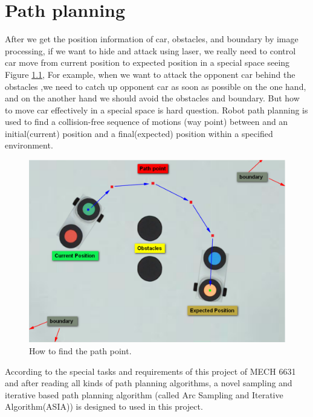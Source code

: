 \chapter{Path planning}
\label{cha:PathPlaning}

After we get the position information of car, obstacles, and boundary by image processing, if we want to hide and attack using laser, we really need to control car move from current position to expected position in a special space seeing Figure \ref{pathpoint},
For example, when we want to attack the opponent car behind the obstacles ,we need to catch up opponent car as soon as possible on the one hand, and on the another hand we should avoid the obstacles and boundary. But how to move car effectively in a special space is hard question. Robot path planning is used to find a collision-free sequence of motions (way point) between and an initial(current) position and a final(expected) position within a specified environment.

\begin{figure}[thb]
    \centering
    \includegraphics[width=1\textwidth]{images/PathPlaningPathPoint.png}
    \caption[How to find the path point]{How to find the path point.}\label{pathpoint}
\end{figure}

According to the special tasks and requirements of this project of MECH 6631 and after reading all kinds of path planning algorithms, a novel sampling and iterative based path planning algorithm (called Arc Sampling and Iterative Algorithm(ASIA)) is designed to used in this project.

